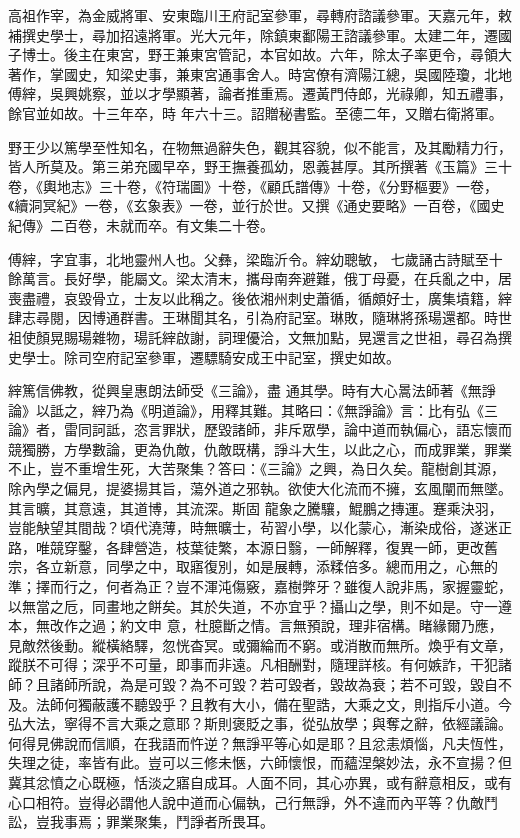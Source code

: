 \begin{pinyinscope}
 高祖作宰，為金威將軍、安東臨川王府記室參軍，尋轉府諮議參軍。天嘉元年，敕補撰史學士，尋加招遠將軍。光大元年，除鎮東鄱陽王諮議參軍。太建二年，遷國子博士。後主在東宮，野王兼東宮管記，本官如故。六年，除太子率更令，尋領大著作，掌國史，知梁史事，兼東宮通事舍人。時宮僚有濟陽江總，吳國陸瓊，北地傅縡，吳興姚察，並以才學顯著，論者推重焉。遷黃門侍郎，光祿卿，知五禮事，餘官並如故。十三年卒，時
 年六十三。詔贈秘書監。至德二年，又贈右衛將軍。



 野王少以篤學至性知名，在物無過辭失色，觀其容貌，似不能言，及其勵精力行，皆人所莫及。第三弟充國早卒，野王撫養孤幼，恩義甚厚。其所撰著《玉篇》三十卷，《輿地志》三十卷，《符瑞圖》十卷，《顧氏譜傳》十卷，《分野樞要》一卷，《續洞冥紀》一卷，《玄象表》一卷，並行於世。又撰《通史要略》一百卷，《國史紀傳》二百卷，未就而卒。有文集二十卷。



 傅縡，字宜事，北地靈州人也。父彝，梁臨沂令。縡幼聰敏，
 七歲誦古詩賦至十餘萬言。長好學，能屬文。梁太清末，攜母南奔避難，俄丁母憂，在兵亂之中，居喪盡禮，哀毀骨立，士友以此稱之。後依湘州刺史蕭循，循頗好士，廣集墳籍，縡肆志尋閱，因博通群書。王琳聞其名，引為府記室。琳敗，隨琳將孫瑒還都。時世祖使顏晃賜瑒雜物，瑒託縡啟謝，詞理優洽，文無加點，晃還言之世祖，尋召為撰史學士。除司空府記室參軍，遷驃騎安成王中記室，撰史如故。



 縡篤信佛教，從興皇惠朗法師受《三論》，盡
 通其學。時有大心暠法師著《無諍論》以詆之，縡乃為《明道論》，用釋其難。其略曰：《無諍論》言：比有弘《三論》者，雷同訶詆，恣言罪狀，歷毀諸師，非斥眾學，論中道而執偏心，語忘懷而競獨勝，方學數論，更為仇敵，仇敵既構，諍斗大生，以此之心，而成罪業，罪業不止，豈不重增生死，大苦聚集？答曰：《三論》之興，為日久矣。龍樹創其源，除內學之偏見，提婆揚其旨，蕩外道之邪執。欲使大化流而不擁，玄風闡而無墜。其言曠，其意遠，其道博，其流深。斯固
 龍象之騰驤，鯤鵬之摶運。蹇乘決羽，豈能觖望其間哉？頃代澆薄，時無曠士，茍習小學，以化蒙心，漸染成俗，遂迷正路，唯競穿鑿，各肆營造，枝葉徒繁，本源日翳，一師解釋，復異一師，更改舊宗，各立新意，同學之中，取寤復別，如是展轉，添糅倍多。總而用之，心無的準；擇而行之，何者為正？豈不渾沌傷竅，嘉樹弊牙？雖復人說非馬，家握靈蛇，以無當之卮，同畫地之餅矣。其於失道，不亦宜乎？攝山之學，則不如是。守一遵本，無改作之過；約文申
 意，杜臆斷之情。言無預說，理非宿構。睹緣爾乃應，見敵然後動。縱橫絡驛，忽恍杳冥。或彌綸而不窮。或消散而無所。煥乎有文章，蹤朕不可得；深乎不可量，即事而非遠。凡相酬對，隨理詳核。有何嫉詐，干犯諸師？且諸師所說，為是可毀？為不可毀？若可毀者，毀故為衰；若不可毀，毀自不及。法師何獨蔽護不聽毀乎？且教有大小，備在聖誥，大乘之文，則指斥小道。今弘大法，寧得不言大乘之意耶？斯則褒貶之事，從弘放學；與奪之辭，依經議論。
 何得見佛說而信順，在我語而忤逆？無諍平等心如是耶？且忿恚煩惱，凡夫恆性，失理之徒，率皆有此。豈可以三修未愜，六師懷恨，而蘊涅槃妙法，永不宣揚？但冀其忿憤之心既極，恬淡之寤自成耳。人面不同，其心亦異，或有辭意相反，或有心口相符。豈得必謂他人說中道而心偏執，己行無諍，外不違而內平等？仇敵鬥訟，豈我事焉；罪業聚集，鬥諍者所畏耳。




\end{pinyinscope}
